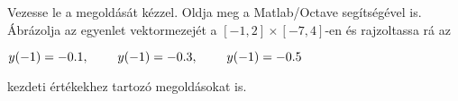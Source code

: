 Vezesse le a 
\de{} megoldását kézzel. 
Oldja meg a Matlab/Octave   segítségével is. 
Ábrázolja az egyenlet vektormezejét a $[-1,2]\times [-7,4]$-en és 
rajzoltassa rá 
az 
\centerline{$y(-1)=-0.1, \hspace{0.8cm} y(-1)=-0.3, \hspace{0.8cm} y(-1)=-0.5$} 
kezdeti értékekhez tartozó megoldásokat is.


